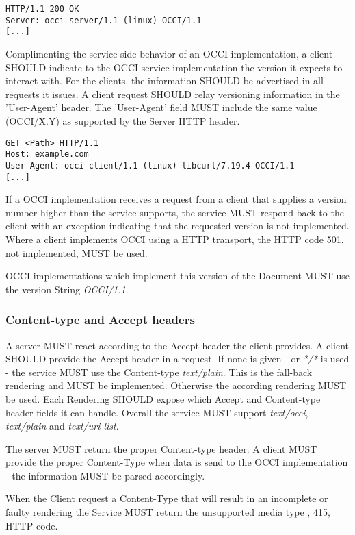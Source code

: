 \documentclass[10pt,a4paper]{article}
\begin{document}
\begin{verbatim}
HTTP/1.1 200 OK
Server: occi-server/1.1 (linux) OCCI/1.1
[...]
\end{verbatim}

Complimenting the service-side behavior of an OCCI implementation, a
client SHOULD indicate to the OCCI service implementation the version
it expects to interact with. For the clients, the information SHOULD
be advertised in all requests it issues. A client request SHOULD relay
versioning information in the 'User-Agent' header. The 'User-Agent'
field MUST include the same value (OCCI/X.Y) as supported by the
Server HTTP header.

\begin{verbatim}
GET <Path> HTTP/1.1
Host: example.com
User-Agent: occi-client/1.1 (linux) libcurl/7.19.4 OCCI/1.1
[...]
\end{verbatim}

If a OCCI implementation receives a request from a client that
supplies a version number higher than the service supports, the
service MUST respond back to the client with an exception indicating
that the requested version is not implemented. Where a client
implements OCCI using a HTTP transport, the HTTP code 501, not
implemented, MUST be used.

OCCI implementations which implement this version of the Document MUST
use the version String \emph{OCCI/1.1}.

\subsubsection{Content-type and Accept headers}
\label{sec:content_type}
A server MUST react according to the Accept header the client
provides. A client SHOULD provide the Accept header in a request. If
none is given - or \textit{*/*} is used - the service MUST use the
Content-type \emph{text/plain}. This is the fall-back rendering and
MUST be implemented. Otherwise the according rendering MUST be
used. Each Rendering SHOULD expose which Accept and Content-type
header fields it can handle. Overall the service MUST support
\textit{text/occi}, \textit{text/plain} and \textit{text/uri-list}.

The server MUST return the proper Content-type header. A client MUST
provide the proper Content-Type when data is send to the OCCI
implementation - the information MUST be parsed accordingly.

When the Client request a Content-Type that will result in an
incomplete or faulty rendering the Service MUST return the unsupported
media type , 415, HTTP code.
\end{document}
